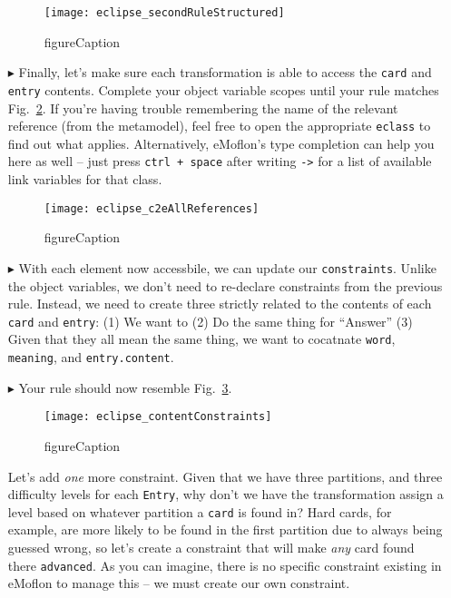 \begin{itemize}
\begin{figure}[htbp]
\begin{center}
  \texttt{[image: eclipse\_secondRuleStructured]}
  \caption{figureCaption}
  \label{fig:c2etargetCorresp}
\end{center}
\end{figure}

\item[$\blacktriangleright$] Finally, let's make sure each transformation is able to access the \texttt{card} and \texttt{entry} contents. Complete your object
variable scopes until your rule matches Fig.~\ref{fig:c2eAllReferences}. If you're having trouble remembering the name of the relevant reference (from the
metamodel), feel free to open the appropriate \texttt{eclass} to find out what applies. Alternatively, eMoflon's type completion can help you here as well --
just press \texttt{ctrl + space} after writing \texttt{->} for a list of available link variables for that class.

\begin{figure}[htbp]
\begin{center}
  \texttt{[image: eclipse\_c2eAllReferences]}
  \caption{figureCaption}
  \label{fig:c2eAllReferences}
\end{center}
\end{figure}

\item[$\blacktriangleright$] With each element now accessbile, we can update our \texttt{constraints}. Unlike the object variables, we don't need to re-declare
constraints from the previous rule. Instead, we need to create three strictly related to the contents of each \texttt{card} and \texttt{entry}:
(1) We want to 
(2) Do the same thing for ``Answer''
(3) Given that they all mean the same thing, we want to cocatnate \texttt{word}, \texttt{meaning}, and \texttt{entry.content}.

\item[$\blacktriangleright$] Your rule should now resemble Fig.~\ref{fig:contentConstraints}.

\begin{figure}[htbp]
\begin{center}
  \texttt{[image: eclipse\_contentConstraints]}
  \caption{figureCaption}
  \label{fig:contentConstraints}
\end{center}
\end{figure}

Let's add \emph{one} more constraint. Given that we have three partitions, and three difficulty levels for each \texttt{Entry}, why don't we have the
transformation assign a level based on whatever partition a \texttt{card} is found in? Hard cards, for example, are more likely to be found in the first
partition due to always being guessed wrong, so let's create a constraint that will make \emph{any} card found there \texttt{advanced}. As you can imagine,
there is no specific constraint existing in eMoflon to manage this -- we must create our own constraint.


\end{itemize}

